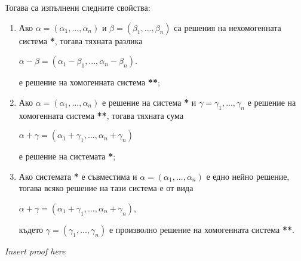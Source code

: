 \documentclass[11pt]{article} %
\newcommand{\enumlet}{\renewcommand{\theenumi}{\alph{enumi}}}
\begin{document}
Тогава са изпълнени следните свойства:
\enumlet
\begin{enumerate}
	\item Ако $\alpha = (\alpha_{1}, ..., \alpha_{n})$ и $\beta = (\beta_{1},...,\beta_{n})$ са решения на нехомогенната система \textbf{*}, тогава тяхната разлика \\
		\centerline{$\alpha - \beta = (\alpha_{1} - \beta_{1},...,\alpha_{n} - \beta_{n})$.}
		е решение на хомогенната система \textbf{**};\\
	\item Ако $\alpha = (\alpha_{1},...,\alpha_{n})$ е решение на система \textbf{*} и $\gamma = \gamma_{1}, ..., \gamma_{n}$ е решение на хомогенната система \textbf{**}, тогава тяхната сума \\
		\centerline{$\alpha + \gamma = (\alpha_{1} + \gamma_{1},..., \alpha_{n} + \gamma_{n})$}
		е решение на системата \textbf{*};\\
	\item Ако системата \textbf{*} е съвместима и $\alpha = (\alpha_{1},...,\alpha_{n})$ е едно нейно решение, тогава всяко решение на тази система е от вида\\
		\centerline{$\alpha + \gamma = (\alpha_{1} + \gamma_{1},...,\alpha_{n}+\gamma_{n})$,}
		където $\gamma = (\gamma_{1},...,\gamma_{n})$ е произволно решение на хомогенната система \textbf{**}.\\
\end{enumerate}

\centerline{\textit{Insert proof here}}
  
\end{document}
